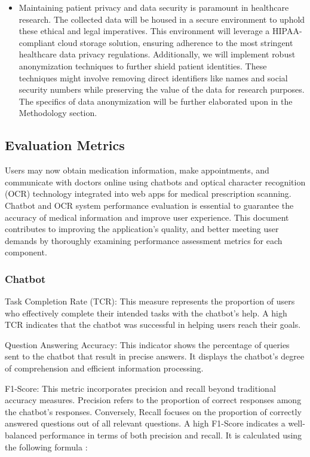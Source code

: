 \documentclass[conference]{IEEEtran}
\begin{document}
\begin{itemize}
        \item Maintaining patient privacy and data security is paramount in healthcare research. The collected data will be housed in a secure environment to uphold these ethical and legal imperatives. This environment will leverage a HIPAA-compliant cloud storage solution, ensuring adherence to the most stringent healthcare data privacy regulations. Additionally, we will implement robust anonymization techniques to further shield patient identities. These techniques might involve removing direct identifiers like names and social security numbers while preserving the value of the data for research purposes. The specifics of data anonymization will be further elaborated upon in the Methodology section.        
    \end{itemize}
    
    \subsection{Evaluation Metrics}
    Users may now obtain medication information, make appointments, and communicate with doctors online using chatbots and optical character recognition (OCR) technology integrated into web apps for medical prescription scanning. Chatbot and OCR system performance evaluation is essential to guarantee the accuracy of medical information and improve user experience. This document contributes to improving the application's quality, and better meeting user demands by thoroughly examining performance assessment metrics for each component.

        \subsubsection{Chatbot}        
        Task Completion Rate (TCR): This measure represents the proportion of users who effectively complete their intended tasks with the chatbot's help. A high TCR indicates that the chatbot was successful in helping users reach their goals.
        
        Question Answering Accuracy: This indicator shows the percentage of queries sent to the chatbot that result in precise answers. It displays the chatbot's degree of comprehension and efficient information processing.
        
        F1-Score: This metric incorporates precision and recall beyond traditional accuracy measures. Precision refers to the proportion of correct responses among the chatbot's responses. Conversely, Recall focuses on the proportion of correctly answered questions out of all relevant questions. A high F1-Score indicates a well-balanced performance in terms of both precision and recall. It is calculated using the following formula \cite{goutte2005probabilistic}:
        
\end{document}
